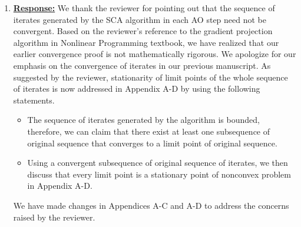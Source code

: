 \begin{enumerate}

\item {}

\vspace{1eM}
\underline{\textbf{Response:}} We thank the reviewer for pointing out that the sequence of iterates generated by the \ac{SCA} algorithm in each \ac{AO} step need not be convergent. Based on the reviewer's reference to the gradient projection algorithm in Nonlinear Programming textbook, we have realized that our earlier convergence proof is not mathematically rigorous. We apologize for our emphasis on the convergence of iterates in our previous manuscript. As suggested by the reviewer, stationarity of limit points of the whole sequence of iterates is now addressed in Appendix A-D by using the following statements. 
\begin{itemize}
	\item The sequence of iterates generated by the algorithm is bounded, therefore, we can claim that there exist at least one subsequence of original sequence that converges to a limit point of original sequence.
	\item Using a convergent subsequence of original sequence of iterates, we then discuss that every limit point is a stationary point of nonconvex problem in Appendix A-D.
\end{itemize}

We have made changes in Appendices A-C and A-D to address the concerns raised by the reviewer.
			

\end{enumerate}
